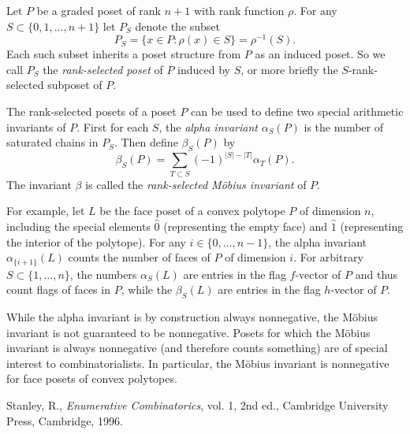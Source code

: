\documentclass[12pt]{article}
\begin{document}
Let $P$ be a graded poset of rank $n+1$ with rank function $\rho$.  For any $S\subset\{0,1,\dots,n+1\}$ let $P_S$ denote the subset
\[
P_S = \{ x \in P \colon \rho(x) \in S \} = \rho^{-1}(S).
\]
Each such subset inherits a poset structure from $P$ as an induced poset.  So we call $P_S$ the {\em rank-selected poset} of $P$ induced by $S$, or more briefly the $S$-rank-selected subposet of $P$.

The rank-selected posets of a poset $P$ can be used to define two special arithmetic invariants of $P$.  First for each $S$, the {\em alpha invariant} $\alpha_S(P)$ is the number of saturated chains in $P_S$.  Then define $\beta_S(P)$ by
\[
\beta_S(P) = \sum_{T\subset S}(-1)^{|S| - |T|}\alpha_T(P).
\]
The invariant $\beta$ is called the {\em rank-selected M\"obius invariant} of $P$.

For example, let $L$ be the face poset of a convex polytope $P$ of dimension $n$, including the special elements $\widehat{0}$ (representing the empty face) and $\widehat{1}$ (representing the interior of the polytope).  For any $i\in\{0,\dots,n-1\}$, the alpha invariant $\alpha_{\{i+1\}}(L)$ counts the number of faces of $P$ of dimension $i$.  For arbitrary $S\subset\{1,\dots,n\}$, the numbers $\alpha_S(L)$ are entries in the flag $f$-vector of $P$ and thus count flags of faces in $P$, while the $\beta_S(L)$ are entries in the flag $h$-vector of $P$.

While the alpha invariant is by construction always nonnegative, the M\"obius invariant is not guaranteed to be nonnegative.  Posets for which the M\"obius invariant is always nonnegative (and therefore counts something) are of special interest to combinatorialists.  In particular, the M\"obius invariant is nonnegative for face posets of convex polytopes.

\begin{thebibliography}{9}
Stanley, R., \emph{Enumerative Combinatorics}, vol. 1, 2nd ed., Cambridge
University Press, Cambridge, 1996.
\end{thebibliography}
\end{document}
